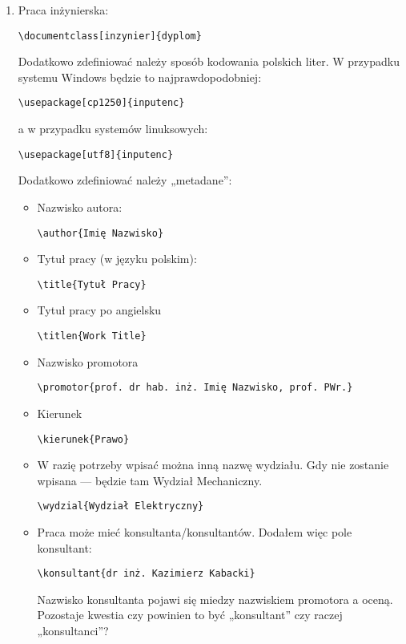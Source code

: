 \begin{enumerate}
\begin{verbatim}
\end{verbatim}
\item
Praca inżynierska:
 \begin{verbatim}
\documentclass[inzynier]{dyplom}
\end{verbatim}
Dodatkowo zdefiniować należy sposób kodowania polskich liter. W przypadku systemu Windows będzie to najprawdopodobniej:
\begin{verbatim}
\usepackage[cp1250]{inputenc}
\end{verbatim}
a w przypadku systemów linuksowych:
\begin{verbatim}
\usepackage[utf8]{inputenc}
\end{verbatim}

Dodatkowo zdefiniować należy „metadane”:
\begin{itemize}
\item
Nazwisko autora:
\begin{verbatim}
\author{Imię Nazwisko}
\end{verbatim}
\item
Tytuł pracy (w języku polskim):
\begin{verbatim}
\title{Tytuł Pracy}
\end{verbatim}
\item
Tytuł pracy po angielsku
\begin{verbatim}
\titlen{Work Title}
\end{verbatim}
\item
Nazwisko promotora
\begin{verbatim}
\promotor{prof. dr hab. inż. Imię Nazwisko, prof. PWr.}
\end{verbatim}
\item
Kierunek
\begin{verbatim}
\kierunek{Prawo}
\end{verbatim}
\item
W razię potrzeby wpisać można inną nazwę wydziału. Gdy nie zostanie wpisana — będzie tam Wydział Mechaniczny.
\begin{verbatim}
\wydzial{Wydział Elektryczny}
\end{verbatim}
\item
Praca może mieć konsultanta/konsultantów. Dodałem więc pole konsultant:
\begin{verbatim}
\konsultant{dr inż. Kazimierz Kabacki}
\end{verbatim}
Nazwisko konsultanta pojawi się miedzy nazwiskiem promotora a oceną. Pozostaje kwestia czy powinien to być „konsultant” czy raczej „konsultanci”?


\end{itemize}
\end{enumerate}
